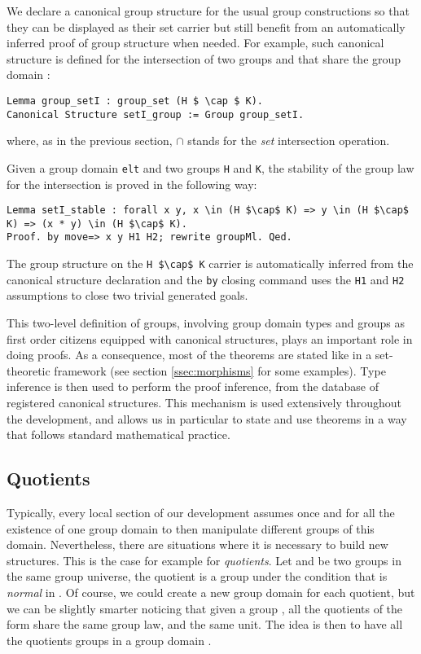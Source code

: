 We declare a canonical group structure for the
usual group constructions so that they can
be displayed as their set carrier but still benefit from an automatically
inferred proof of group structure when needed.
For example, such canonical structure is defined for the intersection of two
groups  and  that share the group domain :
\begin{lstlisting}
Lemma group_setI : group_set (H $ \cap $ K).
Canonical Structure setI_group := Group group_setI.
\end{lstlisting}
\noindent where, as in the previous section, $\cap$ stands for the
\emph{set} intersection operation.

\noindent Given a group domain \lstinline[basicstyle=\footnotesize]+elt+ and two groups \lstinline[basicstyle=\footnotesize]+H+ and
\lstinline[basicstyle=\footnotesize]+K+, the stability of the group law for the intersection is proved in
the following way:
\begin{lstlisting}
Lemma setI_stable : forall x y, x \in (H $\cap$ K) => y \in (H $\cap$ K) => (x * y) \in (H $\cap$ K).
Proof. by move=> x y H1 H2; rewrite groupMl. Qed.
\end{lstlisting}
The group structure on the \lstinline[basicstyle=\footnotesize]+H $\cap$ K+ carrier is
automatically inferred from the
canonical structure declaration and the \lstinline[basicstyle=\footnotesize]+by+
closing command uses the \lstinline[basicstyle=\footnotesize]+H1+ and \lstinline[basicstyle=\footnotesize]+H2+
assumptions to close two trivial generated goals.

This two-level definition of groups, involving group
domain types and groups as first order citizens equipped with
canonical structures, plays an important
role in doing proofs. As a consequence, most of the theorems are
stated like in a set-theoretic framework (see section
\ref{ssec:morphisms} for some examples). Type inference is then used to
perform the proof inference, from the database of registered canonical
structures. This mechanism is used extensively throughout the
development, and allows us in particular to state and use theorems
in a way that follows standard mathematical practice.

\subsection{Quotients}\label{ssec:quotients}

Typically, every local section of our development assumes once and
for all the existence of one group domain  to then manipulate 
different groups of this domain.
Nevertheless, there are situations where it is necessary to build 
new  structures. This is the case for example for
\emph{quotients}.
Let  and  be two groups in the same group universe,
the quotient  is a group under the condition that
 is \emph{normal} in .
Of course, we could create a new group domain for each quotient, but we
can be slightly smarter noticing that given a group , all the 
quotients of the form  share the same  group law, and the same unit.
The idea is then to have all the quotients groups  in a group
domain .

